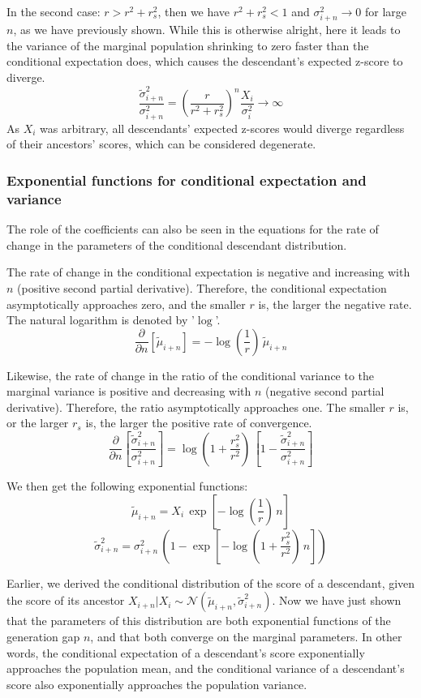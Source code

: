 \documentclass[letterpaper,10pt]{article} %
\begin{document}
In the second case: $r > r^2 + r_s^2$, then we have $r^2 + r_s^2 < 1$ and $\sigma_{i+n}^2 \rightarrow 0$ for large $n$, as we have previously shown. While this is otherwise alright, here it leads to the variance of the marginal population shrinking to zero faster than the conditional expectation does, which causes the descendant's expected z-score to diverge.
$$\frac{\tilde{\sigma}_{i+n}^2}{\sigma_{i+n}^2} = (\frac{r}{r^2+r_s^2})^n \frac{X_i}{\sigma_i^2} \rightarrow \infty$$
As $X_i$ was arbitrary, all descendants' expected z-scores would diverge regardless of their ancestors' scores, which can be considered degenerate. 


\subsubsection*{Exponential functions for conditional expectation and variance}

The role of the coefficients can also be seen in the equations for the rate of change in the parameters of the conditional descendant distribution.

The rate of change in the conditional expectation is negative and increasing with $n$ (positive second partial derivative). Therefore, the conditional expectation asymptotically approaches zero, and the smaller $r$ is, the larger the negative rate. The natural logarithm is denoted by '$\log$'.
$$\frac{\partial }{\partial n}[\tilde{\mu}_{i+n}] = -\log(\frac{1}{r}) \, \tilde{\mu}_{i+n}$$


Likewise, the rate of change in the ratio of the conditional variance to the marginal variance is positive and decreasing with $n$ (negative second partial derivative). Therefore, the ratio asymptotically approaches one. The smaller $r$ is, or the larger $r_s$ is, the larger the positive rate of convergence.
$$\frac{\partial }{\partial n}[\frac{\tilde{\sigma}_{i+n}^2}{\sigma_{i+n}^2}] = \log(1+\frac{r_s^2}{r^2}) \, [1 - \frac{\tilde{\sigma}_{i+n}^2}{\sigma_{i+n}^2}]$$

We then get the following exponential functions:
$$\tilde{\mu}_{i+n} = X_i \, \exp[-\log(\frac{1}{r}) \, n]$$
$$\tilde{\sigma}_{i+n}^2 = \sigma_{i+n}^2 \, (1 - \exp[-\log(1+\frac{r_s^2}{r^2}) \, n])$$

Earlier, we derived the conditional distribution of the score of a descendant, given the score of its ancestor $X_{i+n}|X_i \sim \mathcal{N}( \tilde{\mu}_{i+n}, \tilde{\sigma}_{i+n}^2)$. Now we have just shown that the parameters of this distribution are both exponential functions of the generation gap $n$, and that both converge on the marginal parameters. In other words, the conditional expectation of a descendant's score exponentially approaches the population mean, and the conditional variance of a descendant's score also exponentially approaches the population variance. 
\end{document}
